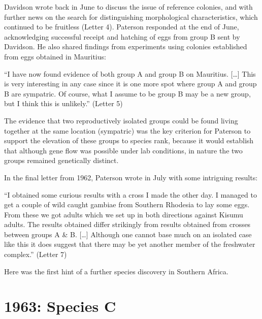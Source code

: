 \begin{refsection}
Davidson wrote back in June to discuss the issue of reference colonies, and with further news on the search for distinguishing morphological characteristics, which continued to be fruitless (Letter 4).
%
Paterson responded at the end of June, acknowledging successful receipt and hatching of eggs from group B sent by Davidson.
%
He also shared findings from experiments using colonies established from eggs obtained in Mauritius:


\begin{displayquote}
``I have now found evidence of both group A and group B on Mauritius. [\ldots] This is very interesting in any case since it is one more spot where group A and group B are sympatric. Of course, what I assume to be group B may be a new group, but I think this is unlikely.'' (Letter 5)
\end{displayquote}


The evidence that two reproductively isolated groups could be found living together at the same location (sympatric) was the key criterion for Paterson to support the elevation of these groups to species rank, because it would establish that although gene flow was possible under lab conditions, in nature the two groups remained genetically distinct.


In the final letter from 1962, Paterson wrote in July with some intriguing results:


\begin{displayquote}
``I obtained some curious results with a cross I made the other day.
I managed to get a couple of wild caught gambiae from Southern Rhodesia to lay some eggs. From these we got adults which we set up in both directions against Kisumu adults. The results obtained differ strikingly from results obtained from crosses between groups A \& B. [\ldots] Although one cannot base much on an isolated case like this it does suggest that there may be yet another member of the freshwater complex.'' (Letter 7)
\end{displayquote}


Here was the first hint of a further species discovery in Southern Africa.


\section{1963: Species C}\label{sec:1963}



\end{refsection}
